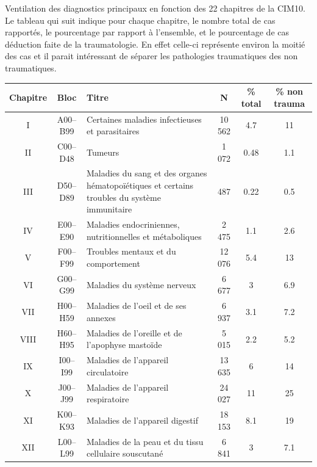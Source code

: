 \documentclass[12pt,english,french,twoside]{book}\usepackage[]{graphicx}\usepackage[]{color}
\begin{document}
Ventilation des diagnostics principaux en fonction des 22 chapitres de la CIM10. Le tableau qui suit indique pour chaque chapitre, le nombre total de cas rapportés, le pourcentage par rapport à l'ensemble, et le pourcentage de cas déduction faite de la traumatologie. En effet celle-ci représente environ la moitié des cas et il parait intéressant de séparer les pathologies traumatiques des non traumatiques.






\begin{longtable}{|c|c|m{4cm}|c|c|c|}
 \hline
 Chapitre & Bloc & Titre & N & \% total  & \% non trauma \\
 \hline
 
I & A00–B99 & Certaines maladies infectieuses et parasitaires & 10 562 & 4.7 & 11 \\
 II&C00–D48&Tumeurs&1 072&0.48&1.1\\
 
III&D50–D89&Maladies du sang et des organes hématopoïétiques et certains troubles du système immunitaire&487&0.22&0.5\\

IV&E00–E90&Maladies endocriniennes, nutritionnelles et métaboliques&2 475&1.1&2.6\\

V&F00–F99&Troubles mentaux et du comportement&12 076&5.4&13\\

VI&G00–G99&Maladies du système nerveux&6 677&3&6.9\\

VII & H00–H59 & Maladies de l'oeil et de ses annexes & 6 937 & 3.1&7.2\\

VIII&H60–H95&Maladies de l'oreille et de l'apophyse mastoïde&5 015&2.2&5.2\\

IX&I00–I99&Maladies de l'appareil circulatoire&13 635&6&14\\

X&J00–J99&Maladies de l'appareil respiratoire&24 027&11&25\\

XI&K00–K93&Maladies de l'appareil digestif&18 153&8.1&19\\

XII&L00–L99&Maladies de la peau et du tissu cellulaire souscutané&6 841&3&7.1\\


\end{longtable}
\end{document}
